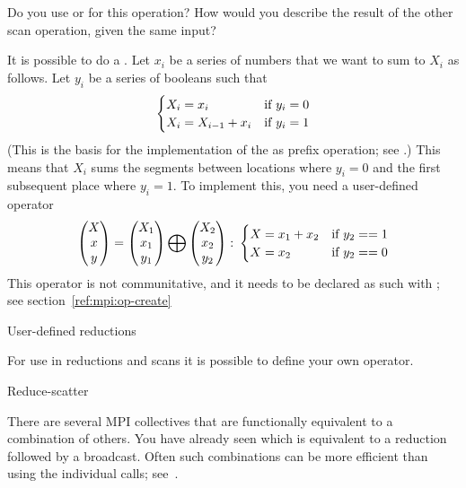 \begin{exercise}
  Do you use  or  for this operation? How
  would you describe the result of the other scan operation, given the
  same input?
\end{exercise}

It is possible to do a . Let $x_i$ be a series of numbers
that we want to sum to $X_i$ as follows. Let $y_i$ be a series of booleans such that
\[ 
\begin{cases}
  X_i=x_i&\hbox{if $y_i=0$}\\
  X_i=X_{i-1}+x_i&\hbox{if $y_i=1$}
\end{cases}
\]
(This is the basis for the implementation of the 
as prefix operation; see .)
This means that $X_i$ sums the segments between locations where $y_i=0$ and the
first subsequent place where $y_i=1$. To implement this, you need a user-defined operator
\[ 
\begin{pmatrix}  X\\ x\\ y\end{pmatrix}
=
\begin{pmatrix}  X_1\\ x_1\\ y_1\end{pmatrix}
\bigoplus
\begin{pmatrix}  X_2\\ x_2\\ y_2\end{pmatrix}\colon
  \begin{cases}
    X=x_1+x_2&\hbox{if $y_2==1$}\\ X=x_2&\hbox{if $y_2==0$}
  \end{cases}
\]
This operator is not communitative, and it needs to be declared as such
with ; see section~\ref{ref:mpi:op-create}

 {User-defined reductions}

For use in reductions and scans it is possible to define your own operator.

 {Reduce-scatter}

There are several MPI collectives that are functionally equivalent to
a combination of others. You have already seen  which
is equivalent to a reduction followed by a broadcast. Often such
combinations can be more efficient than using the individual calls;
see~.

